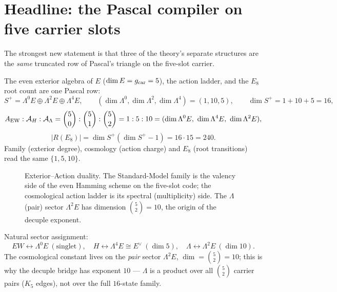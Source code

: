 \section{Headline: the Pascal compiler on five carrier slots}

The strongest new statement is that three of the theory's separate structures are the \emph{same}
truncated row of Pascal's triangle on the five-slot carrier.

\begin{keybox}[Family $=$ action ladder $=$ transition count (one Pascal row)]
The even exterior algebra of $E$ ($\dim E=g_{\mathrm{car}}=5$), the action ladder, and the $E_8$ root count are
one Pascal row:
\[
  S^+=\Lambda^0E\oplus\Lambda^2E\oplus\Lambda^4E,\qquad
  (\dim\Lambda^0,\dim\Lambda^2,\dim\Lambda^4)=(1,10,5),\qquad
  \dim S^+=1+10+5=16,
\]
\[
  A_{\mathrm{EW}}:\mathcal A_H:\mathcal A_\Lambda=\binom50:\binom51:\binom52=1:5:10
  =(\dim\Lambda^0E,\ \dim\Lambda^4E,\ \dim\Lambda^2E),
\]
\[
  |R(E_8)|=\dim S^+(\dim S^+-1)=16\cdot15=240 .
\]
Family (exterior degree), cosmology (action charge) and $E_8$ (root transitions) read the same
$\{1,5,10\}$. \mE
\end{keybox}

\begin{figure}[ht]
\centering
{}
\caption{Exterior--Action duality. The Standard-Model family is the valency side of the even Hamming
scheme on the five-slot code; the cosmological action ladder is its spectral (multiplicity) side. The
$\Lambda$ (pair) sector $\Lambda^2E$ has dimension $\binom52=10$, the origin of the decuple exponent.}
\label{fig:duality}
\end{figure}

\noindent Natural sector assignment:
\[
  \boxed{\ EW\leftrightarrow\Lambda^0E\ (\text{singlet}),\quad
  H\leftrightarrow\Lambda^4E\cong E^\vee\ (\dim5),\quad
  \Lambda\leftrightarrow\Lambda^2E\ (\dim10).\ }
\]
The cosmological constant lives on the \emph{pair} sector $\Lambda^2E$, $\dim=\binom52=10$; this is
why the decuple bridge has exponent $10$ --- $\Lambda$ is a product over all $\binom52$ carrier pairs
($K_5$ edges), not over the full $16$-state family.

